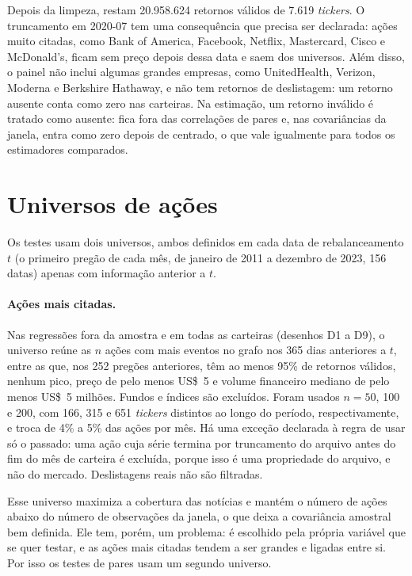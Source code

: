 Depois da limpeza, restam 20.958.624 retornos válidos de 7.619 \emph{tickers}. O truncamento em
2020-07 tem uma consequência que precisa ser declarada: ações muito citadas, como Bank of America,
Facebook, Netflix, Mastercard, Cisco e McDonald's, ficam sem preço depois dessa data e saem dos
universos. Além disso, o painel não inclui algumas grandes empresas, como UnitedHealth, Verizon,
Moderna e Berkshire Hathaway, e não tem retornos de deslistagem: um retorno ausente conta como zero
nas carteiras. Na estimação, um retorno inválido é tratado como ausente: fica fora das correlações de
pares e, nas covariâncias da janela, entra como zero depois de centrado, o que vale igualmente para
todos os estimadores comparados.

\section{Universos de ações}
\label{sec:universos}

Os testes usam dois universos, ambos definidos em cada data de rebalanceamento $t$ (o primeiro pregão
de cada mês, de janeiro de 2011 a dezembro de 2023, 156 datas) apenas com informação anterior a $t$.

\paragraph{Ações mais citadas.} Nas regressões fora da amostra e em todas as carteiras (desenhos D1 a
D9), o universo reúne as $n$ ações com
mais eventos no grafo nos 365 dias anteriores a $t$, entre as que, nos 252 pregões anteriores, têm ao
menos 95\% de retornos válidos, nenhum pico, preço de pelo menos US\$~5 e volume financeiro mediano de
pelo menos US\$~5 milhões. Fundos e índices são excluídos. Foram usados $n=50$, 100 e 200, com 166, 315
e 651 \emph{tickers} distintos ao longo do período, respectivamente, e troca de 4\% a 5\% das ações
por mês. Há uma exceção declarada à regra de usar só o passado: uma ação cuja série termina por
truncamento do arquivo antes do fim do mês de carteira é excluída, porque isso é uma propriedade do
arquivo, e não do mercado. Deslistagens reais não são filtradas.

Esse universo maximiza a cobertura das notícias e mantém o número de ações abaixo do número de
observações da janela, o que deixa a covariância amostral bem definida. Ele tem, porém, um problema: é
escolhido pela própria variável que se quer testar, e as ações mais citadas tendem a ser grandes e
ligadas entre si. Por isso os testes de pares usam um segundo universo.

